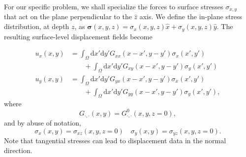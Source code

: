 \documentclass[aps,prl,reprint,twocolumn,groupedaddress,showpacs]{revtex4-1}
\def\dd{\mbox{d}}
\def\r{{\bf r}}
\def\u{{\bf u}}
\def\F{{\bf F}}
\def\F{{\bf F}}
\newcommand{\bs}{\boldsymbol{\sigma}}
\begin{document}
%
%
%
% 

% 

For our specific problem, we shall specialize the forces to surface
stresses $\sigma_{x,y}$ that act on the plane perpendicular to the
$\hat{z}$ axis. We define the in-plane stress distribution, at depth $z$, as
$\bs(x,y,z) = \sigma_{x}(x,y,z)\hat{x} + \sigma_{y}(x,y,z)\hat{y}$. 
The resulting surface-level displacement fields become

\begin{align}
u_{x}(x,y) &= \int_\Omega \dd x'\dd y'G_{xx}( x-x',y-y')\sigma_{x}(x',y') \nonumber\\
&\qquad +  \int_\Omega \dd x'\dd y'G_{xy}( x-x',y-y')\sigma_{y}(x',y') \label{eq:UMODEL1x}  \\
u_y(x,y) &= \int_\Omega \dd x'\dd y'G_{yx}( x-x',y-y')\sigma_{x}(x',y') \nonumber\\
&\qquad +  \int_\Omega \dd x'\dd y'G_{yy}( x-x',y-y')\sigma_{y}(x',y'),  \label{eq:UMODEL1y}  
\end{align}
where
\begin{equation}
G_{\cdot,\cdot}(x,y) = G^0_{\cdot,\cdot}(x,y,z=0),
\end{equation}
and by abuse of notation,
\begin{equation}
\sigma_{x}(x,y) = \sigma_{xz}(x,y,z=0) \quad \sigma_{y}(x,y) = \sigma_{yz}(x,y,z=0) .
\end{equation}
Note that tangential stresses can lead to displacement data in the normal direction.
\end{document}
